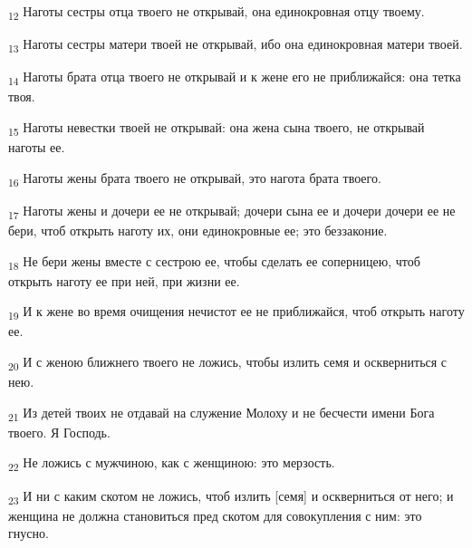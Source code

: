 \begin{tcolorbox}
\textsubscript{12} Наготы сестры отца твоего не открывай, она единокровная отцу твоему.
\end{tcolorbox}
\begin{tcolorbox}
\textsubscript{13} Наготы сестры матери твоей не открывай, ибо она единокровная матери твоей.
\end{tcolorbox}
\begin{tcolorbox}
\textsubscript{14} Наготы брата отца твоего не открывай и к жене его не приближайся: она тетка твоя.
\end{tcolorbox}
\begin{tcolorbox}
\textsubscript{15} Наготы невестки твоей не открывай: она жена сына твоего, не открывай наготы ее.
\end{tcolorbox}
\begin{tcolorbox}
\textsubscript{16} Наготы жены брата твоего не открывай, это нагота брата твоего.
\end{tcolorbox}
\begin{tcolorbox}
\textsubscript{17} Наготы жены и дочери ее не открывай; дочери сына ее и дочери дочери ее не бери, чтоб открыть наготу их, они единокровные ее; это беззаконие.
\end{tcolorbox}
\begin{tcolorbox}
\textsubscript{18} Не бери жены вместе с сестрою ее, чтобы сделать ее соперницею, чтоб открыть наготу ее при ней, при жизни ее.
\end{tcolorbox}
\begin{tcolorbox}
\textsubscript{19} И к жене во время очищения нечистот ее не приближайся, чтоб открыть наготу ее.
\end{tcolorbox}
\begin{tcolorbox}
\textsubscript{20} И с женою ближнего твоего не ложись, чтобы излить семя и оскверниться с нею.
\end{tcolorbox}
\begin{tcolorbox}
\textsubscript{21} Из детей твоих не отдавай на служение Молоху и не бесчести имени Бога твоего. Я Господь.
\end{tcolorbox}
\begin{tcolorbox}
\textsubscript{22} Не ложись с мужчиною, как с женщиною: это мерзость.
\end{tcolorbox}
\begin{tcolorbox}
\textsubscript{23} И ни с каким скотом не ложись, чтоб излить [семя] и оскверниться от него; и женщина не должна становиться пред скотом для совокупления с ним: это гнусно.
\end{tcolorbox}
